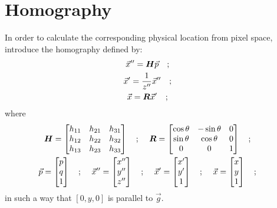 \section{Homography}
%
In order to calculate the corresponding physical location from pixel space, introduce the homography defined by:
%
\begin{gather} 
	\vec{x}'' = \boldsymbol{H}  \vec{p} \text{\quad ; \quad} \\
	\vec{x}' = \frac{1}{z''} \vec{x}'' \text{\quad ; \quad} \\
	\vec{x} = \boldsymbol{R} \vec{x}' \text{\quad ; \quad} \label{eqn:physical-data}
\end{gather}
%
where
%
\begin{gather*}
	\boldsymbol{H} =
	\begin{bmatrix}
	h_{11} & h_{21} & h_{31} \\
	h_{12} & h_{22} & h_{32} \\
	h_{13} & h_{23} & h_{33} \\
	\end{bmatrix} \text{\quad ; \quad}
	\boldsymbol{R} =
	\begin{bmatrix}
	\cos{\theta} & -\sin{\theta} & 0 \\
	\sin{\theta} & \cos{\theta} & 0 \\
	0 & 0 & 1 \\
	\end{bmatrix} \text{\quad ; \quad} \\
	\vec{p}= \begin{bmatrix} p \\ q \\ 1 \end{bmatrix} \text{\quad ; \quad}
	\vec{x}'' = \begin{bmatrix} x'' \\ y'' \\ z'' \end{bmatrix} \text{\quad ; \quad}
	\vec{x}' = \begin{bmatrix} x' \\ y' \\ 1 \end{bmatrix} \text{\quad ; \quad}
	\vec{x} = \begin{bmatrix} x \\ y \\ 1 \end{bmatrix} \text{\quad ; \quad}
\end{gather*}
%
in such a way that $[0,y,0]$ is parallel to $\vec{g}$. \par
